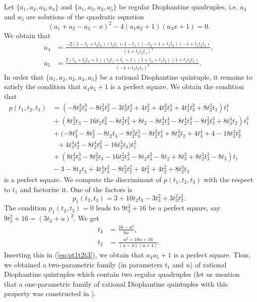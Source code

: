 \documentclass[a4paper]{amsart}
\theoremstyle{plain}
\theoremstyle{definition}
\begin{document}
Let $\{a_1,a_2,a_3,a_4\}$ and $\{a_1,a_2,a_3,a_5\}$ be regular Diophantine quadruples,
i.e. $a_4$ and $a_5$ are solutions of the quadratic equation
$$ (a_1+a_2-a_3-x)^2 - 4(a_1a_2+1)(a_3x+1) = 0. $$
We obtain that
\begin{align*}
a_4 &=\frac{-2(1-t_3+t_2t_3)(t_3t_1+1-t_1)(-t_2+1+t_1t_2)(-1+t_1t_2t_3)}{(1+t_1t_2t_3)^3}, \\
a_5 &=\frac{2(t_3+t_2t_3+1)(t_3t_1+t_1+1)(1+t_2+t_1t_2)(1+t_1t_2t_3)}{(-1+t_1t_2t_3)^3}.
\end{align*}%
In order that $\{a_1,a_2,a_3,a_4,a_5\}$ be a rational Diophantine quintuple, it remains to satisfy the
condition that $a_4a_5+1$ is a perfect square. We obtain the condition that
\begin{align} \label{eq:pt1t2t3}
p(t_1,t_2,t_3)&=(-8t_2^3t_3^3-8t_3^2t_2^2-3t_3^4t_2^4+4t_2^2+4t_2^2t_3^4+4t_2^4t_3^2+8t_2^3t_3)t_1^4 \\
&\mbox{}+(8t_2^2t_3-16t_2t_3^2-8t_2^3t_3^2+8t_2-8t_2^3t_3^4-8t_2^4t_3^3-8t_2^2t_3^3+8t_3^4t_2)t_1^3 \nonumber \\
&\mbox{}+(-8t_3^2-8t_2^2-8t_2t_3-8t_2^3t_3^3-8t_2^2t_3^4+8t_3^3t_2+4t_3^4+4-18t_3^2t_2^2 \nonumber \\
&\mbox{}\,\,\,\,+4t_3^4t_2^4-8t_2^4t_3^2-16t_2^3t_3)t_1^2 \nonumber \\
&\mbox{}+(8t_2^4t_3^3-8t_2^2t_3-16t_2^2t_3^3-8t_2t_3^2-8t_2+8t_3^3+8t_2^3t_3^2-8t_3)t_1
\nonumber \\
&\mbox{}-3-8t_2t_3+4t_2^4t_3^2-8t_3^2t_2^2+4t_3^2+4t_2^2+8t_2^3t_3
\nonumber
\end{align}
is a perfect square. We compute the discriminant of $p(t_1,t_2,t_3)$ with the respect to $t_1$ and
factorize it. One of the factors is
$$ p_1(t_2,t_3)= 3+10t_2t_3-3t_3^2+3t_3^2t_2^2. $$
The condition $p_1(t_2,t_3)=0$ leads to $9t_3^2+16$ be a perfect square, say
$9t_3^2+16 = (3t_3+u)^2$. We get
\begin{align*}
t_3 &= \frac{16-u^2} {6u}, \\
t_2 &= \frac{u^2+10u+16} {(u-4)(u+4)}.
\end{align*}
Inserting this in (\ref{eq:pt1t2t3}), we obtain that $a_4a_5+1$ is a perfect square.
Thus, we obtained a two-parametric family (in parameters $t_1$ and $u$)
of rational Diophantine quintuples which contain two regular quadruples
(let us mention that a one-parametric family of rational Diophantine quintuples
with this property was constructed in \cite{duje-rocky1}).
\end{document}

